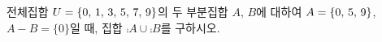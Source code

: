 전체집합 $U=\{0,\mkern3mu 1,\mkern3mu 3,\mkern3mu 5,\mkern3mu 7,\mkern3mu 9\}$의 두 부분집합 $A$, $B$에 대하여 $A=\{0,\mkern3mu 5,\mkern3mu 9\}$, $A-B=\{0\}$일 때, 집합 $\comp{A}\cup\comp{B}$를 구하시오.
